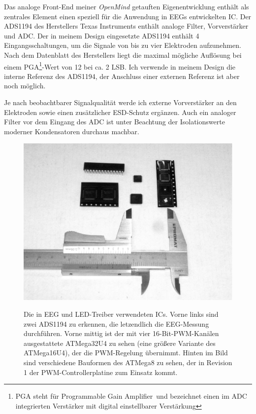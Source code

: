 \documentclass[12pt,a4paper,notitlepage]{article}
\begin{document}
Das analoge Front-End meiner \emph{OpenMind} getauften Eigenentwicklung enthält als zentrales Element einen speziell für die Anwendung in \glspl{EEG} entwickelten \gls{IC}. Der ADS1194 des Herstellers Texas Instruments enthält analoge Filter, Vorverstärker und ADC\cite{TEXAS1}. Der in meinem Design eingesetzte ADS1194 enthält 4 Eingangsschaltungen, um die Signale von bis zu vier Elektroden aufzunehmen. Nach dem Datenblatt des Herstellers liegt die maximal mögliche Auflösung bei einem PGA\footnote{PGA steht für \glqq Programmable Gain Amplifier\grqq\ und bezeichnet einen im ADC integrierten Verstärker mit digital einstellbarer Verstärkung}-Wert von 12 bei ca. 2 \gls{LSB}. Ich verwende in meinem Design die interne Referenz des ADS1194, der Anschluss einer externen Referenz ist aber noch möglich\cite{TEXAS1,TEXAS11,ANALOG6,LINEAR6,MAXIM6}.

Je nach beobachtbarer Signalqualität werde ich externe Vorverstärker an den Elektroden sowie einen zusätzlicher ESD-Schutz ergänzen. Auch ein analoger Filter vor dem Eingang des ADC ist unter Beachtung der Isolationswerte moderner Kondensatoren durchaus machbar\cite{PHILIPS3,PHILIPS4,PHILIPS5,PHILIPS6,WIMA1,STM1,CHEEVER1,NATIONAL2,MAXIM45}.

\begin{figure}
\centering
\includegraphics[width=15cm]{images/chips_smaller.eps}
\label{ics_used}
\caption{Die in EEG und LED-Treiber verwendeten ICs. Vorne links sind zwei ADS1194 zu erkennen, die letzendlich die EEG-Messung durchführen. Vorne mittig ist der mit vier 16-Bit-PWM-Kanälen ausgestattete ATMega32U4 zu sehen (eine größere Variante des ATMega16U4), der die PWM-Regelung übernimmt. Hinten im Bild sind verschiedene Bauformen des ATMega8 zu sehen, der in Revision 1 der PWM-Controllerplatine zum Einsatz kommt.}
\end{figure}
\end{document}

